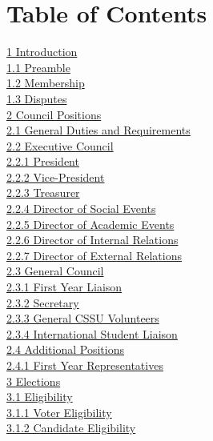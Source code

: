 \documentclass{article}
\begin{document}
\section*{Table of Contents}
\hyperref[sec:1]{1 Introduction} \\
\indent \hyperref[sec:1.1]{1.1 Preamble} \\
\indent \hyperref[sec:1.2]{1.2 Membership} \\
\indent \hyperref[sec:1.3]{1.3 Disputes} \\
\hyperref[sec:2]{2 Council Positions} \\
\indent \hyperref[sec:2.1]{2.1 General Duties and Requirements} \\
\indent \hyperref[sec:2.2]{2.2 Executive Council} \\
\indent \indent \hyperref[sec:2.2.1]{2.2.1 President} \\
\indent \indent \hyperref[sec:2.2.2]{2.2.2 Vice-President} \\
\indent \indent \hyperref[sec:2.2.3]{2.2.3 Treasurer} \\
\indent \indent \hyperref[sec:2.2.4]{2.2.4 Director of Social Events} \\
\indent \indent \hyperref[sec:2.2.5]{2.2.5 Director of Academic Events} \\
\indent \indent \hyperref[sec:2.2.6]{2.2.6 Director of Internal Relations} \\
\indent \indent \hyperref[sec:2.2.7]{2.2.7 Director of External Relations} \\
\indent \hyperref[sec:2.3]{2.3 General Council} \\
\indent \indent \hyperref[sec:2.3.1]{2.3.1 First Year Liaison} \\
\indent \indent \hyperref[sec:2.3.2]{2.3.2 Secretary} \\
\indent \indent \hyperref[sec:2.3.3]{2.3.3 General CSSU Volunteers} \\
\indent \indent \hyperref[sec:2.3.4]{2.3.4 International Student Liaison} \\
\indent \hyperref[sec:2.4]{2.4 Additional Positions} \\
\indent \indent \hyperref[sec:2.4.1]{2.4.1 First Year Representatives} \\
\hyperref[sec:3]{3 Elections} \\
\indent \hyperref[sec:3.1]{3.1 Eligibility} \\
\indent \indent \hyperref[sec:3.1.1]{3.1.1 Voter Eligibility} \\
\indent \indent \hyperref[sec:3.1.2]{3.1.2 Candidate Eligibility} \\
\end{document}
